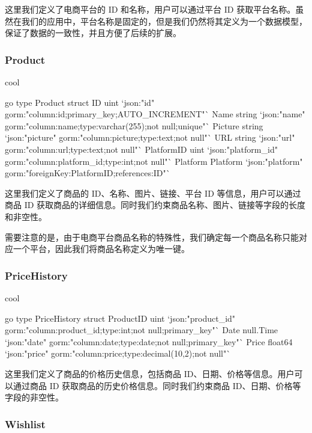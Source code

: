 这里我们定义了电商平台的 ID 和名称，用户可以通过平台 ID 获取平台名称。虽然在我们的应用中，平台名称是固定的，但是我们仍然将其定义为一个数据模型，保证了数据的一致性，并且方便了后续的扩展。

\subsubsection{Product}

\begin{codebox}{}{cool}
\begin{amzcode}{go}
type Product struct {
	ID         uint     `json:"id" gorm:"column:id;primary_key;AUTO_INCREMENT"`
	Name       string   `json:"name" gorm:"column:name;type:varchar(255);not null;unique"`
	Picture    string   `json:"picture" gorm:"column:picture;type:text;not null"`
	URL        string   `json:"url" gorm:"column:url;type:text;not null"`
	PlatformID uint     `json:"platform_id" gorm:"column:platform_id;type:int;not null"`
	Platform   Platform `json:"platform" gorm:"foreignKey:PlatformID;references:ID"`
}
\end{amzcode}
\end{codebox}

这里我们定义了商品的 ID、名称、图片、链接、平台 ID 等信息，用户可以通过商品 ID 获取商品的详细信息。同时我们约束商品名称、图片、链接等字段的长度和非空性。

需要注意的是，由于电商平台商品名称的特殊性，我们确定每一个商品名称只能对应一个平台，因此我们将商品名称定义为唯一键。

\subsubsection{PriceHistory}

\begin{codebox}{}{cool}
\begin{amzcode}{go}
type PriceHistory struct {
	ProductID uint      `json:"product_id" gorm:"column:product_id;type:int;not null;primary_key"`
	Date      null.Time `json:"date" gorm:"column:date;type:date;not null;primary_key"`
	Price     float64   `json:"price" gorm:"column:price;type:decimal(10,2);not null"`
}
\end{amzcode}
\end{codebox}

这里我们定义了商品的价格历史信息，包括商品 ID、日期、价格等信息。用户可以通过商品 ID 获取商品的历史价格信息。同时我们约束商品 ID、日期、价格等字段的非空性。

\subsubsection{Wishlist}

